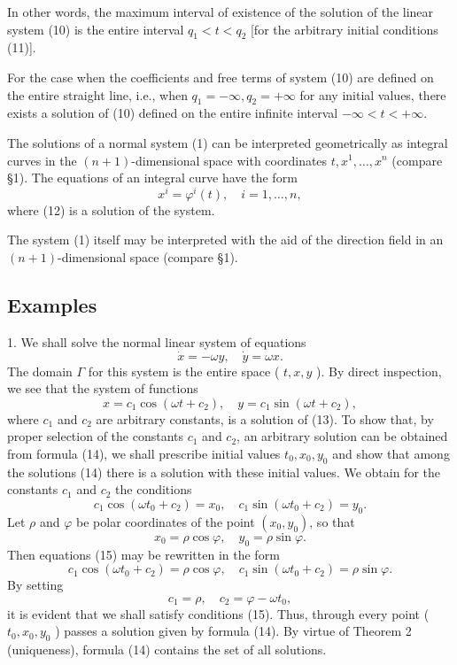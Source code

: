 \documentclass[10pt,a5paper]{book}
\theoremstyle{plain}
\theoremstyle{definition}
\theoremstyle{remark}
\begin{document}
In other words, the maximum interval of existence of the solution of the linear system (10) is the entire interval $q_{1}<t<q_{2}$ [for the arbitrary initial conditions (11)].

For the case when the coefficients and free terms of system (10) are defined on the entire straight line, i.e., when $q_{1}=-\infty, q_{2}=+\infty$ for any
initial values, there exists a solution of (10) defined on the entire infinite interval $-\infty<t<+\infty$.

The solutions of a normal system (1) can be interpreted geometrically as integral curves in the $(n+1)$-dimensional space with coordinates $t, x^{1}, \ldots, x^{n}$ (compare §1). The equations of an integral curve have the form
\begin{equation*}
x^{i}=\varphi^{i}(t), \quad i=1, \ldots, n, \tag{12}
\end{equation*}
where (12) is a solution of the system.

The system (1) itself may be interpreted with the aid of the direction field in an $(n+1)$-dimensional space (compare §1).

\subsection*{Examples}
1. We shall solve the normal linear system of equations
\begin{equation*}
\dot{x}=-\omega y, \quad \dot{y}=\omega x . \tag{13}
\end{equation*}
The domain $\Gamma$ for this system is the entire space ( $t, x, y$ ). By direct inspection, we see that the system of functions
\begin{equation*}
x=c_{1} \cos \left(\omega t+c_{2}\right), \quad y=c_{1} \sin \left(\omega t+c_{2}\right), \tag{14}
\end{equation*}
where $c_{1}$ and $c_{2}$ are arbitrary constants, is a solution of (13). To show that, by proper selection of the constants $c_{1}$ and $c_{2}$, an arbitrary solution can be obtained from formula (14), we shall prescribe initial values $t_{0}, x_{0}, y_{0}$ and show that among the solutions (14) there is a solution with these initial values. We obtain for the constants $c_{1}$ and $c_{2}$ the conditions
\begin{equation*}
c_{1} \cos \left(\omega t_{0}+c_{2}\right)=x_{0}, \quad c_{1} \sin \left(\omega t_{0}+c_{2}\right)=y_{0} . \tag{15}
\end{equation*}
Let $\rho$ and $\varphi$ be polar coordinates of the point $\left(x_{0}, y_{0}\right)$, so that
\[
x_{0}=\rho \cos \varphi, \quad y_{0}=\rho \sin \varphi .
\]
Then equations (15) may be rewritten in the form
\[
c_{1} \cos \left(\omega t_{0}+c_{2}\right)=\rho \cos \varphi, \quad c_{1} \sin \left(\omega t_{0}+c_{2}\right)=\rho \sin \varphi .
\]
By setting
\[
c_{1}=\rho, \quad c_{2}=\varphi-\omega t_{0},
\]
it is evident that we shall satisfy conditions (15). Thus, through every point ( $t_{0}, x_{0}, y_{0}$ ) passes a solution given by formula (14). By virtue of Theorem 2 (uniqueness), formula (14) contains the set of all solutions.
\end{document}
